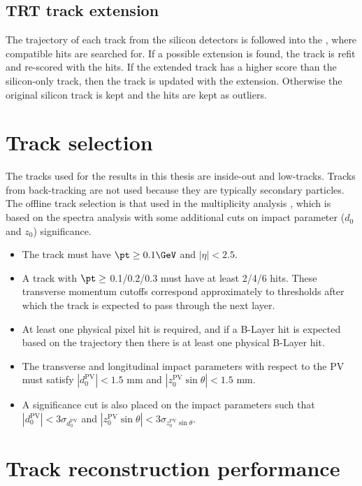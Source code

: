 \subsection{TRT track extension}

The trajectory of each track from the silicon detectors is followed into the \trt, where compatible hits are searched for.
If a possible extension is found, the track is refit and re-scored with the \trt hits.
If the extended track has a higher score than the silicon-only track, then the track is updated with the extension.
Otherwise the original silicon track is kept and the \trt hits are kept as outliers.

\section{Track selection} %

The tracks used for the results in this thesis are inside-out and low-\pt tracks.
Tracks from back-tracking are not used because they are typically secondary particles.
The offline track selection is that used in the \pPb multiplicity analysis \cite{HION-2012-15}, which is based on the \pp \minbias spectra analysis \cite{STDM-2010-06} with some additional cuts on impact parameter ($d_0$ and $z_0$) significance.
\begin{itemize}
\item
  The track must have $\pt \geq 0.1 \GeV$ and $|\eta| < 2.5$.
\item
  A track with $\pt \geq $ 0.1/0.2/0.3 \GeV must have at least 2/4/6 \sct hits.
  These transverse momentum cutoffs correspond approximately to thresholds after which the track is expected to pass through the next \sct layer.
\item
  At least one physical pixel hit is required, and if a B-Layer hit is expected based on the trajectory then there is at least one physical B-Layer hit.
\item
  The transverse and longitudinal impact parameters with respect to the \ac{PV} must satisfy $|d_0^\textrm{PV}| < 1.5 \textrm{ mm}$ and $|z_0^\textrm{PV} \sin\theta| < 1.5 \textrm{ mm}$.
\item
  A significance cut is also placed on the impact parameters such that $|d_0^\textrm{PV}| < 3\sigma_{d_0^\textrm{PV}}$ and $|z_0^\textrm{PV} \sin\theta| < 3\sigma_{z_0^\textrm{PV} \sin\theta}$.
\end{itemize}


\section{Track reconstruction performance}

